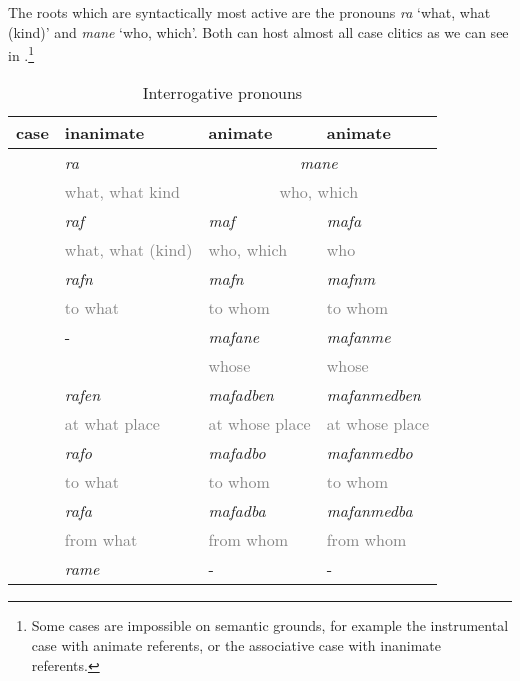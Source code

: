 The roots which are syntactically most active are the  pronouns \emph{ra} `what, what (kind)' and \emph{mane} `who, which'. Both can host almost all case clitics as we can see in .\footnote{Some cases are impossible on semantic grounds, for example the instrumental case with animate referents, or the associative case with inanimate referents.}

\begin{table}
\caption{Interrogative pronouns}
\label{interrogatives-table}
	\begin{tabularx}{\textwidth}{XXXX}
		\lsptoprule
		{case} & {inanimate} & {animate} \Sg & {animate} \Nsg\\
		\hline
		\Abs & \emph{ra}&\multicolumn{2}{|c|}{\emph{mane}}\\
		&\textcolor{gray}{\footnotesize what, what kind} &\multicolumn{2}{|c|}{\textcolor{gray}{\footnotesize who, which}}\\\cline{3-4}
		{\Erg} &\emph{raf}&\emph{maf} &\emph{mafa}\\
		& \textcolor{gray}{\footnotesize what, what (kind)} &\textcolor{gray}{\footnotesize who, which} &\textcolor{gray}{\footnotesize who}\\
		\Dat &\emph{rafn}&\emph{mafn} &\emph{mafnm}\\
		&\textcolor{gray}{\footnotesize to what} &\textcolor{gray}{\footnotesize to whom} &\textcolor{gray}{\footnotesize to whom}\\
		\Poss &- &\emph{mafane} &\emph{mafanme}\\
		& &\textcolor{gray}{\footnotesize whose} &\textcolor{gray}{\footnotesize whose}\\
		\Loc &\emph{rafen} &\emph{mafadben} &\emph{mafanmedben}\\
		&\textcolor{gray}{\footnotesize at what place}&\textcolor{gray}{\footnotesize at whose place} &\textcolor{gray}{\footnotesize at whose place}\\
		\All &\emph{rafo} &\emph{mafadbo} &\emph{mafanmedbo}\\
		&\textcolor{gray}{\footnotesize to what} &\textcolor{gray}{\footnotesize to whom} &\textcolor{gray}{\footnotesize to whom}\\
		\Abl &\emph{rafa} &\emph{mafadba} &\emph{mafanmedba}\\
		&\textcolor{gray}{\footnotesize from what} &\textcolor{gray}{\footnotesize from whom} &\textcolor{gray}{\footnotesize from whom}\\
		\Ins &\emph{rame}&-&-\\

\end{tabularx}
\end{table}
